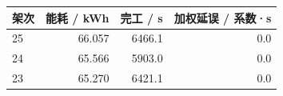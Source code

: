 \begin{tabular}{lrrr}
\toprule
架次 & 能耗 / kWh & 完工 / s & 加权延误 / 系数·s \\
\midrule
25 & 66.057 & 6466.1 & 0.0 \\
24 & 65.566 & 5903.0 & 0.0 \\
23 & 65.270 & 6421.1 & 0.0 \\
\bottomrule
\end{tabular}

